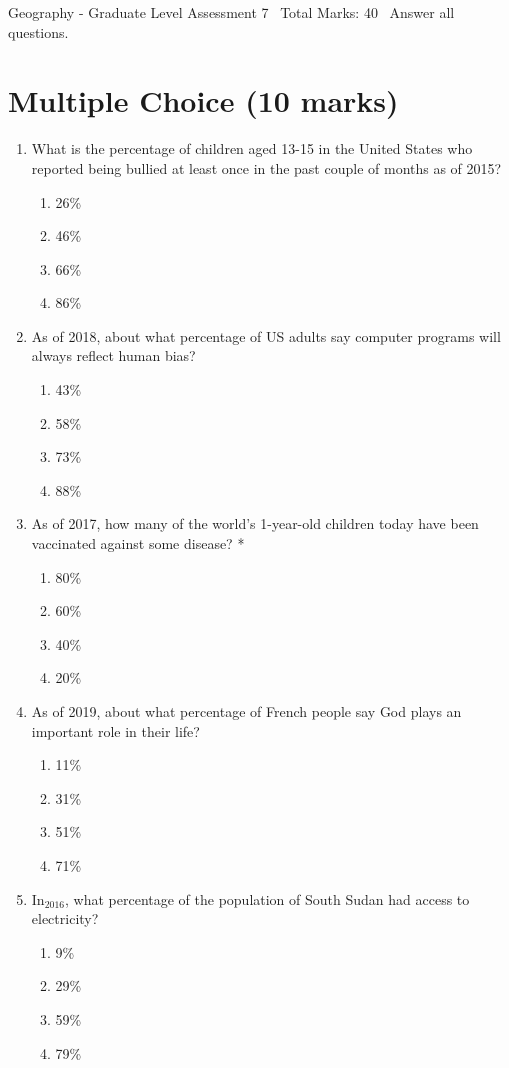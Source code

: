 \documentclass[12pt]{article}
\begin{document}
\begin{center}
Geography - Graduate Level Assessment 7 \
Total Marks: 40 \
Answer all questions.
\end{center}

\section*{Multiple Choice (10 marks)}
\begin{enumerate}[label=\arabic*.]
\item What is the percentage of children aged 13-15 in the United States who reported being bullied at least once in the past couple of months as of 2015?
\begin{enumerate}[label=(\alph*)]
    \item 26\%
    \item 46\%
    \item 66\%
    \item 86\%
\end{enumerate}
\item As of 2018, about what percentage of US adults say computer programs will always reflect human bias?
\begin{enumerate}[label=(\alph*)]
    \item 43\%
    \item 58\%
    \item 73\%
    \item 88\%
\end{enumerate}
\item As of 2017, how many of the world's 1-year-old children today have been vaccinated against some disease? *
\begin{enumerate}[label=(\alph*)]
    \item 80\%
    \item 60\%
    \item 40\%
    \item 20\%
\end{enumerate}
\item As of 2019, about what percentage of French people say God plays an important role in their life?
\begin{enumerate}[label=(\alph*)]
    \item 11\%
    \item 31\%
    \item 51\%
    \item 71\%
\end{enumerate}
\item In$_{2016}$, what percentage of the population of South Sudan had access to electricity?
\begin{enumerate}[label=(\alph*)]
    \item 9\%
    \item 29\%
    \item 59\%
    \item 79\%
\end{enumerate}
\end{enumerate}
\end{document}
